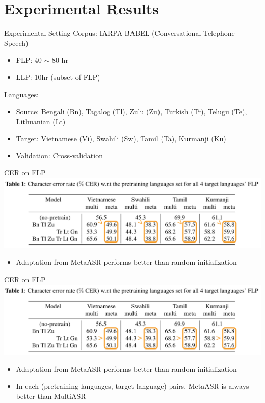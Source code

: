 \documentclass{beamer}
\begin{document}
\section{Experimental Results}
\begin{frame}[t]{Experimental Setting}
  Corpus: IARPA-BABEL (Conversational Telephone Speech)
  \begin{itemize}
    \item FLP: 40 $\sim$ 80 hr
    \item LLP: 10hr (subset of FLP)
  \end{itemize}
  \pause
  Languages:
  \begin{itemize}
    \item Source: Bengali (Bn), Tagalog (Tl), Zulu (Zu), Turkish (Tr), Telugu (Te), Lithuanian (Lt)
    \item Target: Vietnamese (Vi), Swahili (Sw), Tamil (Ta), Kurmanji (Ku)
    \item Validation: Cross-validation
  \end{itemize}
\end{frame}

\begin{frame}[t]{CER on FLP}
  \center \includegraphics[width=1.0\textwidth]{fig/flp_hl1.png}

  \begin{itemize}
    \item Adaptation from MetaASR performs better than random initialization
  \end{itemize}
\end{frame}

\begin{frame}[t]{CER on FLP}
  \center \includegraphics[width=1.0\textwidth]{fig/flp_hl2.png}

  \begin{itemize}
    \item Adaptation from MetaASR performs better than random initialization
    \item In each (pretraining languages, target language) pairs, MetaASR is always better than MultiASR
  \end{itemize}
\end{frame}
\end{document}
